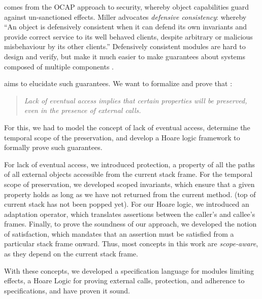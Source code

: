 
 
comes from the OCAP approach to security, whereby object capabilities guard against un-sanctioned effects.
Miller \cite{miller-esop2013,MillerPhD} advocates
 \emph{defensive consistency}: whereby %
 {``An object is defensively
  consistent when it can defend its own invariants and provide correct
  service to its well behaved clients, despite arbitrary or malicious
  misbehaviour by its other clients.''}  Defensively consistent
modules  are  hard to design %
 and  verify, but
make it much
easier to make guarantees about systems composed of multiple components
\cite{Murray10dphil}.

  aims to elucidate such guarantees. We want to formalize and prove  that 
\cite{permissionAuthority}:
\begin{quote}
\emph{Lack of eventual access implies that certain properties will be preserved, even in the presence of external calls.}
\end{quote}
For this, we had  to  model the concept of  lack of eventual access,  determine the temporal scope of the preservation, and  develop a Hoare logic framework to formally prove such guarantees.

For lack of eventual access,  we introduced protection, %
a property of all  the paths of all external objects accessible from the current stack frame.
For the  temporal scope of preservation, we developed scoped invariants, which ensure that a given property holds as long as we have not returned from the current method.
  (top of current stack has not been popped yet). 
 For our Hoare logic, we introduced an adaptation operator, which translates assertions between the caller’s and callee’s frames. 
 Finally, to prove the soundness of our approach, we developed the notion of \strong satisfaction,  which mandates that an assertion must be satisfied from a particular stack frame onward. 
 Thus, most concepts in this work are  \emph{scope-aware}, as they depend  on the current stack frame.
 
 With these concepts, we %
 developed a specification language for modules limiting effects, a Hoare Logic for proving external calls, protection, and adherence to specifications, and have proven it sound. %

